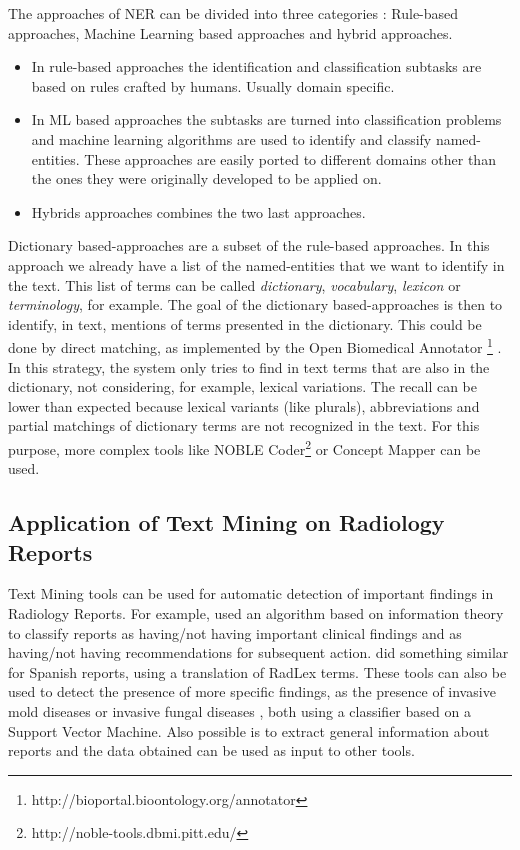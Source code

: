 The approaches of NER can be divided into three categories \citep{Mansouri2008}: Rule-based approaches, Machine Learning based approaches and hybrid approaches. 

\begin{itemize}
\item In rule-based approaches the identification and classification subtasks are based on rules crafted by humans. Usually domain specific. 
\item In ML based approaches the subtasks are turned into classification problems and machine learning algorithms are used to identify and classify named-entities. These approaches are easily ported to different domains other than the ones they were originally developed to be applied on.
\item Hybrids approaches combines the two last approaches.
\end{itemize}

Dictionary based-approaches are a subset of the rule-based approaches. In this approach we already have a list of the named-entities that we want to identify in the text. This list of terms can be called \textit{dictionary}, \textit{vocabulary}, \textit{lexicon} or \textit{terminology}, for example. The goal of the dictionary based-approaches is then to identify, in text, mentions of terms presented in the dictionary. This could be done by direct matching, as implemented by the Open Biomedical Annotator \footnote{http://bioportal.bioontology.org/annotator} \citep{Jonquet2009}. In this strategy, the system only tries to find in text terms that are also in the dictionary, not considering, for example, lexical variations. The recall can be lower than expected because lexical variants (like plurals), abbreviations and partial matchings of dictionary terms are not recognized in the text. For this purpose, more complex tools like NOBLE Coder\footnote{http://noble-tools.dbmi.pitt.edu/} \citep{Tseytlin2016} or Concept Mapper \citep{Stewart} can be used.

\subsection{Application of Text Mining on Radiology Reports}

Text Mining tools can be used for automatic detection of important findings in Radiology Reports. For example, \citep{Dreyer2005} used an algorithm based on information theory to classify reports as having/not having important clinical findings and as having/not having recommendations for subsequent action. \citep{Cotik2015} did something similar for Spanish reports, using a translation of RadLex terms. These tools can also be used to detect the presence of more specific findings, as the presence of invasive mold diseases  \citep{Ananda-Rajah2014} or invasive fungal diseases \citep{Martinez2015}, both using a classifier based on a Support Vector Machine. Also possible is to extract general information about reports \citep{Hassanpour2016} and the data obtained can be used as input to other tools.

